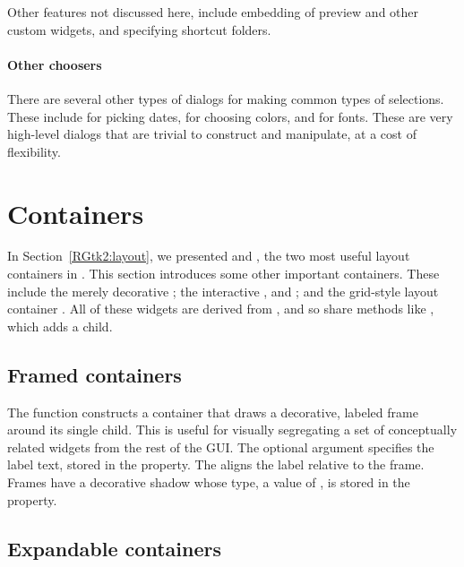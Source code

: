 Other features not discussed here, include embedding of preview and
other custom widgets, and specifying shortcut folders.

\paragraph{Other choosers}
There are several other types of dialogs for making common types of
selections. These include  for picking dates,
 for choosing colors, and
 for fonts. These are very high-level
dialogs that are trivial to construct and manipulate, at a cost of
flexibility.


\section{Containers}
\label{sec:containers}

In Section~\ref{RGtk2:layout}, we presented  and
, the two most useful layout containers in
\GTK. This section introduces some other important containers. These
include the merely decorative ; the interactive
,  and ; and the
grid-style layout container . All of these widgets are
derived from , and so share methods like
, which adds a child.

\subsection{Framed containers}
\label{sec:RGtk2:gtkFrame}

The  function constructs a container that draws
a decorative, labeled frame around its single child. This is useful
for visually segregating a set of conceptually related widgets from
the rest of the GUI.  The optional  argument
specifies the label text, stored in the  property. The
 aligns the label relative to the
frame.  Frames have a decorative shadow whose type, a value of
, is stored in the  property.

\subsection{Expandable containers}
\label{sec:RGtk2:gtkExpander}

